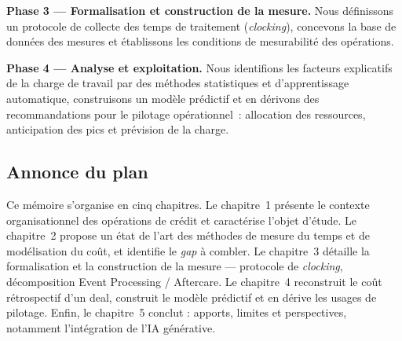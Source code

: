 \textbf{Phase 3 --- Formalisation et construction de la mesure.} Nous définissons un protocole de collecte des temps de traitement (\textit{clocking}), concevons la base de données des mesures et établissons les conditions de mesurabilité des opérations.

\textbf{Phase 4 --- Analyse et exploitation.} Nous identifions les facteurs explicatifs de la charge de travail par des méthodes statistiques et d'apprentissage automatique, construisons un modèle prédictif et en dérivons des recommandations pour le pilotage opérationnel~: allocation des ressources, anticipation des pics et prévision de la charge.

\subsection*{Annonce du plan}

Ce mémoire s'organise en cinq chapitres. Le chapitre~1 présente le contexte
organisationnel des opérations de crédit et caractérise l'objet d'étude. Le
chapitre~2 propose un état de l'art des méthodes de mesure du temps et de
modélisation du coût, et identifie le \textit{gap} à combler. Le chapitre~3
détaille la formalisation et la construction de la mesure --- protocole de
\textit{clocking}, décomposition Event Processing / Aftercare. Le chapitre~4
reconstruit le coût rétrospectif d'un deal, construit le modèle prédictif et
en dérive les usages de pilotage. Enfin, le chapitre~5 conclut : apports,
limites et perspectives, notamment l'intégration de l'IA générative.

